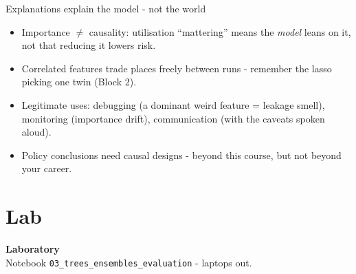 \documentclass[10pt,aspectratio=169]{beamer}
\begin{document}
\begin{frame}{Explanations explain the model - not the world}
  \begin{itemize}
    \item Importance $\ne$ causality: utilisation ``mattering'' means the
          \emph{model} leans on it, not that reducing it lowers risk.
    \item Correlated features trade places freely between runs -
          remember the lasso picking one twin (Block 2).
    \item Legitimate uses: \alert{debugging} (a dominant weird feature =
          leakage smell), \alert{monitoring} (importance drift),
          \alert{communication} (with the caveats spoken aloud).
    \item Policy conclusions need causal designs - beyond this course,
          but not beyond your career.
  \end{itemize}
\end{frame}

\section{Lab}

\begin{frame}[plain]
  \begin{center}
    \vspace{1.5cm}
    {\LARGE\textbf{Laboratory}}\\[0.6cm]
    {\normalsize Notebook \texttt{03\_trees\_ensembles\_evaluation} - laptops out.}
  \end{center}
\end{frame}
\end{document}
